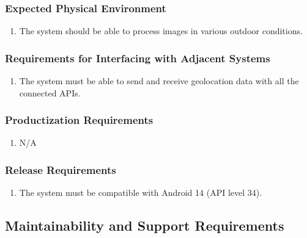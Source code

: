 \documentclass[]{article}
\begin{document}
\subsubsection{Expected Physical Environment}
\label{ssub:expected_physical_environment}
\begin{enumerate}[{OE-EPE}1. ]
	\item The system should be able to process images in various outdoor conditions.
\end{enumerate}

\subsubsection{Requirements for Interfacing with Adjacent Systems}
\label{ssub:requirements_for_interfacing_with_adjacent_systems}
\begin{enumerate}[{OE-IA}1. ]
	\item The system must be able to send and receive geolocation data with all the connected APIs.
\end{enumerate}

\subsubsection{Productization Requirements}
\label{ssub:productization_requirements}
\begin{enumerate}[{OE-P}1. ]
	\item N/A
\end{enumerate}

\subsubsection{Release Requirements}
\label{ssub:release_requirements}
\begin{enumerate}[{OE-R}1. ]
	\item The system must be compatible with Android 14 (API level 34).
\end{enumerate}


\subsection{Maintainability and Support Requirements}
\label{sub:maintainability_and_support_requirements}
\end{document}
